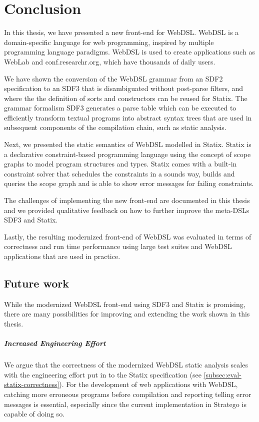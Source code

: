 
\chapter{\label{chap:conclusion}Conclusion}

  In this thesis, we have presented a new front-end for WebDSL. WebDSL is a domain-specific language for web programming, inspired by multiple programming language paradigms. WebDSL is used to create applications such as WebLab and conf.researchr.org, which have thousands of daily users.

  We have shown the conversion of the WebDSL grammar from an SDF2 specification to an SDF3 that is disambiguated without post-parse filters, and where the the definition of sorts and constructors can be reused for Statix. The grammar formalism SDF3 generates a parse table which can be executed to efficiently transform textual programs into abstract syntax trees that are used in subsequent components of the compilation chain, such as static analysis.

  Next, we presented the static semantics of WebDSL modelled in Statix. Statix is a declarative constraint-based programming language using the concept of scope graphs to model program structures and types. Statix comes with a built-in constraint solver that schedules the constraints in a sounds way, builds and queries the scope graph and is able to show error messages for failing constraints.

  The challenges of implementing the new front-end are documented in this thesis and we provided qualitative feedback on how to further improve the meta-DSLs SDF3 and Statix.

  Lastly, the resulting modernized front-end of WebDSL was evaluated in terms of correctness and run time performance using large test suites and WebDSL applications that are used in practice.

  \section{\label{sec:future-work}Future work}

  While the modernized WebDSL front-end using SDF3 and Statix is promising, there are many possibilities for improving and extending the work shown in this thesis.

  \paragraph{Increased Engineering Effort} We argue that the correctness of the modernized WebDSL static analysis scales with the engineering effort put in to the Statix specification (see \cref{subsec:eval-statix-correctness}). For the development of web applications with WebDSL, catching more erroneous programs before compilation and reporting telling error messages is essential, especially since the current implementation in Stratego is capable of doing so.

